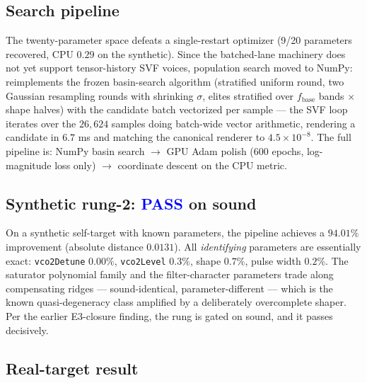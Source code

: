\documentclass[10pt]{article}
\newcommand{\pass}{\textcolor{blue}{\textbf{PASS}}}
\newcommand{\code}[1]{\texttt{#1}}
\begin{document}
\subsection{Search pipeline}

The twenty-parameter space defeats a single-restart optimizer (9/20 parameters recovered, CPU $0.29$ on the synthetic). Since the batched-lane machinery does not yet support tensor-history SVF voices, population search moved to NumPy:  reimplements the frozen basin-search algorithm (stratified uniform round, two Gaussian resampling rounds with shrinking $\sigma$, elites stratified over $f_{\mathrm{base}}$ bands $\times$ shape halves) with the candidate batch vectorized per sample --- the SVF loop iterates over the $26{,}624$ samples doing batch-wide vector arithmetic, rendering a candidate in $6.7$ ms and matching the canonical renderer to $4.5\times10^{-8}$. The full pipeline is: NumPy basin search $\to$ GPU Adam polish ($600$ epochs, log-magnitude loss only) $\to$ coordinate descent on the CPU metric.

\subsection{Synthetic rung-2: \pass{} on sound}

On a synthetic self-target with known parameters, the pipeline achieves a $\mathbf{94.01\%}$ improvement (absolute distance $0.0131$). All \emph{identifying} parameters are essentially exact: \code{vco2Detune} $0.00\%$, \code{vco2Level} $0.3\%$, shape $0.7\%$, pulse width $0.2\%$. The saturator polynomial family and the filter-character parameters trade along compensating ridges --- sound-identical, parameter-different --- which is the known quasi-degeneracy class amplified by a deliberately overcomplete shaper. Per the earlier E3-closure finding, the rung is gated on sound, and it passes decisively.

\subsection{Real-target result}
\end{document}
